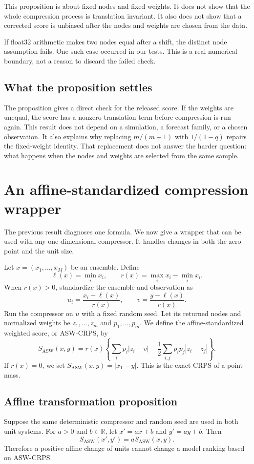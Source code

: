 \documentclass[11pt]{article}
\begin{document}
This proposition is about fixed nodes and fixed weights. It does not show that the whole compression process is translation invariant. It also does not show that a corrected score is unbiased after the nodes and weights are chosen from the data.

If float32 arithmetic makes two nodes equal after a shift, the distinct node assumption fails. One such case occurred in our tests. This is a real numerical boundary, not a reason to discard the failed check.

\subsection*{What the proposition settles}
The proposition gives a direct check for the released score. If the weights are unequal, the score has a nonzero translation term before compression is run again. This result does not depend on a simulation, a forecast family, or a chosen observation. It also explains why replacing $m/(m-1)$ with $1/(1-q)$ repairs the fixed-weight identity. That replacement does not answer the harder question: what happens when the nodes and weights are selected from the same sample.

\section{An affine-standardized compression wrapper}

The previous result diagnoses one formula. We now give a wrapper that can be used with any one-dimensional compressor. It handles changes in both the zero point and the unit size.

Let $x=(x_1,\ldots,x_M)$ be an ensemble. Define
\[
\ell(x)=\min_i x_i,
\qquad
r(x)=\max_i x_i-\min_i x_i.
\]
When $r(x)>0$, standardize the ensemble and observation as
\[
u_i=\frac{x_i-\ell(x)}{r(x)},
\qquad
v=\frac{y-\ell(x)}{r(x)}.
\]
Run the compressor on $u$ with a fixed random seed. Let its returned nodes and normalized weights be $z_1,\ldots,z_m$ and $p_1,\ldots,p_m$. We define the affine-standardized weighted score, or ASW-CRPS, by
\[
S_{\mathrm{ASW}}(x,y)
=r(x)\left\{
\sum_i p_i|z_i-v|
-\frac12\sum_{i,j}p_ip_j|z_i-z_j|
\right\}.
\]
If $r(x)=0$, we set $S_{\mathrm{ASW}}(x,y)=|x_1-y|$. This is the exact CRPS of a point mass.

\subsection*{Affine transformation proposition}
Suppose the same deterministic compressor and random seed are used in both unit systems. For $a>0$ and $b\in\mathbb{R}$, let $x'=ax+b$ and $y'=ay+b$. Then
\[
S_{\mathrm{ASW}}(x',y')=aS_{\mathrm{ASW}}(x,y).
\]
Therefore a positive affine change of units cannot change a model ranking based on ASW-CRPS.
\end{document}
